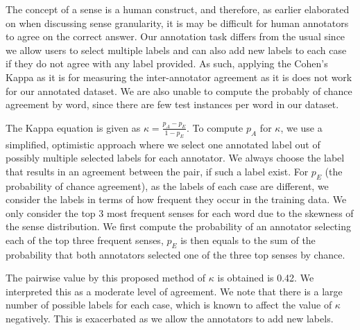 {%
The concept of a sense is a human construct, and therefore, as earlier elaborated on when discussing sense granularity, it is %
may be difficult for human annotators to agree on the correct answer. 
Our annotation task differs from the usual since we allow users to select multiple labels and can also add new labels to each case if they do not agree with any label provided. As such, applying the Cohen's Kappa as it is for measuring the inter-annotator agreement as it is does not work for our annotated dataset. %
We are also unable to compute the probably of chance agreement by word, since there are few test instances per word in our dataset.

The Kappa equation is given as 
$\kappa = \frac{p_A - p_E}{1 - p_E} $.
To compute $p_A$ for $\kappa$, we use a simplified, optimistic approach where we select one annotated label out of possibly multiple selected labels for each annotator. We always choose the label that results in an agreement between the pair, if such a label exist. For $p_E$ (the probability of chance agreement), as the labels of each case are different, we consider the labels in terms of how frequent they occur in the training data. 
We only consider the top 3 most frequent senses for each word %
due to the skewness of the sense distribution. 
We first compute the probability of an annotator selecting each of the top three frequent senses, $p_E$ is then equals to the sum of the probability that both annotators selected one of the three top senses by chance. 

The pairwise value by this proposed method of $\kappa$ is obtained is 0.42. We interpreted this as a moderate level of agreement. We note that there is a large number of possible labels for each case, which is known to affect the value of $\kappa$ negatively. This is exacerbated as we allow the annotators to add new labels. 

}
